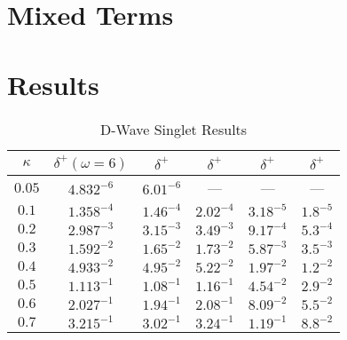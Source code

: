 \documentclass[Dissertation.tex]{subfiles}
\begin{document}
\section{Mixed Terms}
\label{sec:MixedTerms}


\section{Results}


\begin{table}[H]
\centering
\begin{tabular}{|c|c|c|c|c|c|}
\hline
$\kappa$ & $\delta^+ (\omega = 6)$ & $\delta^+$ \cite{Blackwood2002} & $\delta^+$ \cite{Walters2004} & $\delta^+$ \cite{Ray1997} & $\delta^+$ \cite{Adhikari1999} \\
\hline
$0.05$ & $4.832^{-6}$ & $6.01^{-6}$ & --- & --- & --- \\
$0.1$ & $1.358^{-4}$ & $1.46^{-4}$ & $2.02^{-4}$ & $3.18^{-5}$ & $1.8^{-5}$ \\
$0.2$ & $2.987^{-3}$ & $3.15^{-3}$ & $3.49^{-3}$ & $9.17^{-4}$ & $5.3^{-4}$ \\
$0.3$ & $1.592^{-2}$ & $1.65^{-2}$ & $1.73^{-2}$ & $5.87^{-3}$ & $3.5^{-3}$ \\
$0.4$ & $4.933^{-2}$ & $4.95^{-2}$ & $5.22^{-2}$ & $1.97^{-2}$ & $1.2^{-2}$ \\
$0.5$ & $1.113^{-1}$ & $1.08^{-1}$ & $1.16^{-1}$ & $4.54^{-2}$ & $2.9^{-2}$ \\
$0.6$ & $2.027^{-1}$ & $1.94^{-1}$ & $2.08^{-1}$ & $8.09^{-2}$ & $5.5^{-2}$ \\
$0.7$ & $3.215^{-1}$ & $3.02^{-1}$ & $3.24^{-1}$ & $1.19^{-1}$ & $8.8^{-2}$ \\
\hline
\end{tabular}
\caption{D-Wave Singlet Results}
\label{tab:DWaveSinglet}
\end{table}


\end{document}
